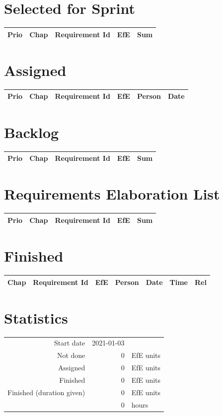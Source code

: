 \section{Selected for Sprint}
\begin{longtable}{|r|c|p{7cm}||r|r|} \hline
\textbf{Prio} & \textbf{Chap} & \textbf{Requirement Id} & \textbf{EfE} & \textbf{Sum} \\ \hline\endhead
\end{longtable}\section{Assigned}
\begin{longtable}{|r|c|p{6.5cm}||r|l|l|} \hline
\textbf{Prio} & \textbf{Chap} & \textbf{Requirement Id} & \textbf{EfE} & \textbf{Person} & \textbf{Date} \\ \hline\endhead
\end{longtable}\section{Backlog}
\begin{longtable}{|r|c|p{7cm}||r|r|} \hline
\textbf{Prio} & \textbf{Chap} & \textbf{Requirement Id} & \textbf{EfE} & \textbf{Sum} \\ \hline\endhead
\end{longtable}\section{Requirements Elaboration List}
\begin{longtable}{|r|c|p{7cm}||r|r|} \hline
\textbf{Prio} & \textbf{Chap} & \textbf{Requirement Id} & \textbf{EfE} & \textbf{Sum} \\ \hline\endhead
\end{longtable}\section{Finished}
{\small \begin{longtable}{|c|p{5.5cm}||r|l|l|r|r|} \hline
\textbf{Chap} & \textbf{Requirement Id} & \textbf{EfE} & \textbf{Person} & \textbf{Date} & \textbf{Time} & \textbf{Rel} \\ \hline\endhead
\end{longtable}}\section{Statistics}
\begin{longtable}{rrl}
Start date & 2021-01-03 & \\ 
Not done & 0 & EfE units \\ 
Assigned & 0 & EfE units \\ 
Finished & 0 & EfE units \\ 
Finished (duration given) & 0 & EfE units \\ 
 & 0 & hours \\ 
\end{longtable}